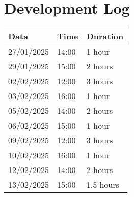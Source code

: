 \documentclass{article}
\begin{document}
\section{Development Log}
\begin{table}[H]
    \centering
    \begin{tabular}{lll}
        \toprule
        \textbf{Data} & \textbf{Time} & \textbf{Duration} \\
        \midrule
        27/01/2025    & 14:00         & 1 hour            \\
        29/01/2025    & 15:00         & 2 hours           \\
        02/02/2025    & 12:00         & 3 hours           \\
        03/02/2025    & 16:00         & 1 hour            \\
        05/02/2025    & 14:00         & 2 hours           \\
        06/02/2025    & 15:00         & 1 hour            \\
        09/02/2025    & 12:00         & 3 hours           \\
        10/02/2025    & 16:00         & 1 hour            \\
        12/02/2025    & 14:00         & 2 hours           \\
        13/02/2025    & 15:00         & 1.5 hours         \\
        \bottomrule
    \end{tabular}
\end{table}
\end{document}
